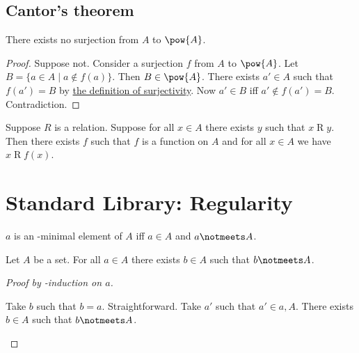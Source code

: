 \subsection{Cantor's theorem}


\begin{theorem}[Cantor]\label{cantor}
    There exists no surjection from $A$ to $\pow{A}$.
\end{theorem}
\begin{proof}
    Suppose not.
    Consider a surjection $f$ from $A$ to $\pow{A}$.
    Let $B = \{a \in A \mid a\notin f(a)\}$.
    Then $B\in\pow{A}$.
    There exists $a'\in A$ such that $f(a') = B$ by \hyperref[surj]{the definition of surjectivity}.
    Now $a' \in B$ iff $a' \notin f(a') = B$.
    Contradiction.
\end{proof}

\begin{axiom}\label{axiom_of_choice}
    Suppose $R$ is a relation.
    Suppose for all $x\in A$ there exists $y$ such that $x\mathrel{R} y$.
    Then there exists $f$ such that $f$ is a function on $A$ and for all $x\in A$ we have $x\mathrel{R} f(x)$.
\end{axiom}

\section{Standard Library: Regularity}

\begin{abbreviation}\label{elemminimal}
    $a$ is an \in-minimal element of $A$ iff
    $a\in A$ and $a\notmeets A$.
\end{abbreviation}

\begin{lemma}\label{regularity_aux}
    Let $A$ be a set.
    For all $a\in A$ there exists $b\in A$ such that
    $b\notmeets A$.
\end{lemma}
\begin{proof}[Proof by \in-induction on $a$]
    \begin{byCase}
            Take $b$ such that $b = a$.
            Straightforward.
            Take $a'$ such that $a'\in a, A$.
            There exists $b\in A$ such that $b\notmeets A$.
    \end{byCase}
\end{proof}

